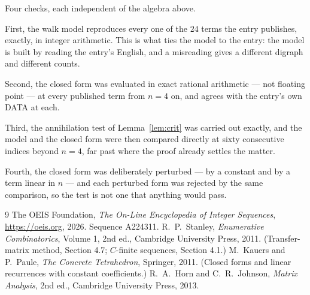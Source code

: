 \documentclass[11pt,a4paper]{article}
\theoremstyle{plain}
\theoremstyle{definition}
\begin{document}
Four checks, each independent of the algebra above.

First, the walk model reproduces every one of the $24$ terms the entry publishes,
exactly, in integer arithmetic. This is what ties the model to the entry: the model is built
by reading the entry's English, and a misreading gives a different digraph and different
counts.

Second, the closed form was evaluated in exact rational arithmetic --- not floating point ---
at every published term from $n=4$ on, and agrees with the entry's own DATA at each.

Third, the annihilation test of Lemma~\ref{lem:crit} was carried out exactly, and the model
and the closed form were then compared directly at sixty consecutive indices beyond
$n=4$, far past where the proof already settles the matter.

Fourth, the closed form was deliberately perturbed --- by a constant and by a term linear in
$n$ --- and each perturbed form was rejected by the same comparison, so the test is not one
that anything would pass.

\begin{thebibliography}{9}
 The OEIS Foundation, \emph{The On-Line Encyclopedia of Integer
Sequences}, \url{https://oeis.org}, 2026. Sequence A224311.
 R.~P.~Stanley, \emph{Enumerative Combinatorics}, Volume 1, 2nd ed.,
Cambridge University Press, 2011. (Transfer-matrix method, Section 4.7; $C$-finite sequences,
Section 4.1.)
 M.~Kauers and P.~Paule, \emph{The Concrete Tetrahedron}, Springer, 2011.
(Closed forms and linear recurrences with constant coefficients.)
 R.~A.~Horn and C.~R.~Johnson, \emph{Matrix Analysis}, 2nd ed., Cambridge
University Press, 2013.
\end{thebibliography}
\end{document}
